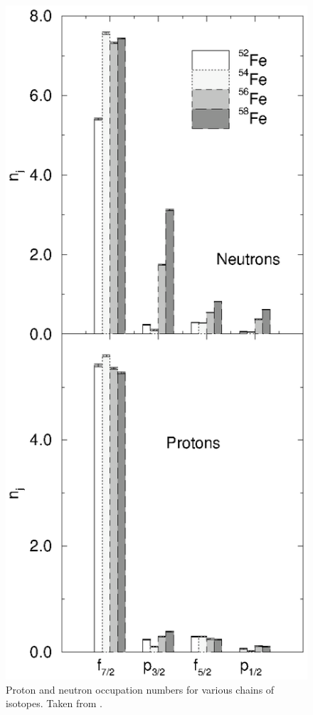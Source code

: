 \documentclass[rmp,aps,floatfix]{revtex4}
\begin{document}
\begin{figure}
\includegraphics[scale=0.5,angle=0]{dean_hjorthjensen_fig16.ps}
\caption{Proton and neutron occupation numbers for various chains of isotopes.
Taken from  \protect\cite{Langanke95}.}
\label{fp_occs}
\end{figure}
\end{document}
